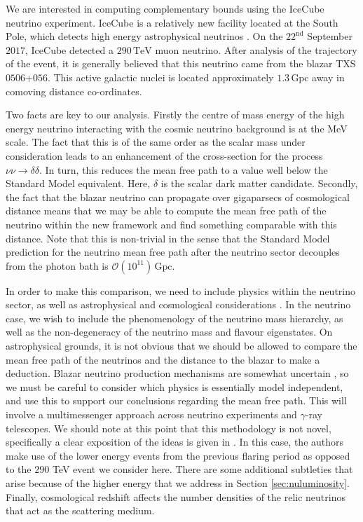 \documentclass[11pt]{article}
\numberwithin{equation}{section}
\numberwithin{figure}{section}
\numberwithin{table}{section}
\newcommand{\mO}{\mathcal{O}}
\begin{document}
We are interested in computing complementary bounds using the IceCube neutrino experiment. IceCube is a relatively new facility located at the South Pole, which detects high energy astrophysical neutrinos \cite{Kelly, Padovani2018, IceCube, IceCube2018, Ackermann2018, Difranzo2015, Hooper2018, Ioka2014}. On the $22^{\textrm{nd}}$ September $2017$, IceCube detected a $290\,\textrm{TeV}$ muon neutrino. After analysis of the trajectory of the event, it is generally believed that this neutrino came from the blazar TXS $0506$+$056$. This active galactic nuclei is located approximately $1.3 \,\textrm{Gpc}$ away in comoving distance co-ordinates.

Two facts are key to our analysis. Firstly the centre of mass energy of the high energy neutrino interacting with the cosmic neutrino background is at the MeV scale. The fact that this is of the same order as the scalar mass under consideration leads to an enhancement of the cross-section for the process $\nu\nu \rightarrow \delta\delta$. In turn, this reduces the mean free path to a value well below the Standard Model equivalent. Here, $\delta$ is the scalar dark matter candidate. Secondly, the fact that the blazar neutrino can propagate over gigaparsecs of cosmological distance means that we may be able to compute the mean free path of the neutrino within the new framework and find something comparable with this distance. Note that this is non-trivial in the sense that the Standard Model prediction for the neutrino mean free path after the neutrino sector decouples from the photon bath is $\mO(10^{11}) \, \textrm{Gpc}$.

In order to make this comparison, we need to include physics within the neutrino sector, as well as astrophysical and cosmological considerations \cite{Bertuzzo, Bellini2018, Ringwald2004, Couchot2017, King, dermer2009high, Karmakar2018, Pandey2019}. In the neutrino case, we wish to include the phenomenology of the neutrino mass hierarchy, as well as the non-degeneracy of the neutrino mass and flavour eigenstates. On astrophysical grounds, it is not obvious that we should be allowed to compare the mean free path of the neutrinos and the distance to the blazar to make a deduction. Blazar neutrino production mechanisms are somewhat uncertain \cite{Padovani2018, Padovani2019, Keivani2018}, so we must be careful to consider which physics is essentially model independent, and use this to support our conclusions regarding the mean free path. This will involve a multimessenger approach across neutrino experiments and $\gamma$-ray telescopes. We should note at this point that this methodology is not novel, specifically a clear exposition of the ideas is given in \cite{Kelly}. In this case, the authors make use of the lower energy events from the previous flaring period as opposed to the $290$ TeV event we consider here. There are some additional subtleties that arise because of the higher energy that we address in Section \ref{sec:nuluminosity}. Finally, cosmological redshift affects the number densities of the relic neutrinos that act as the scattering medium.
\end{document}

